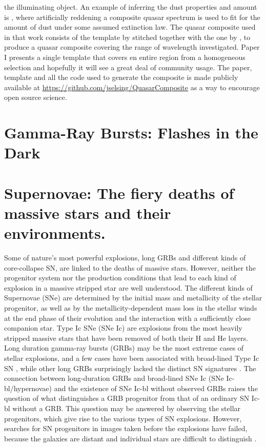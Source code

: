 the illuminating object. An example of inferring the dust properties and amount
is \citet{Krogager2015}, where artificially reddening a composite quasar
spectrum is used to fit for the amount of dust under some assumed extinction
law. The quasar composite used in that work consists of the template by
\citet{Vandenberk2001} stitched together with the one by \citet{Glikman2006}, to
produce a quasar composite covering the range of wavelength investigated. Paper
I presents a single template that covers en entire region from a homogeneous
selection and hopefully it will see a great deal of community usage. The paper,
template and all the code used to generate the composite is made publicly
available at \url{https://github.com/jselsing/QuasarComposite} as a way to
encourage open source science.

\section{Gamma-Ray Bursts: Flashes in the Dark}
\label{sec:intro:grb}


\section{Supernovae: The fiery deaths of massive stars and their environments.}
\label{sec:intro:sn}

Some of nature's most powerful explosions, long
  GRBs and different kinds of core-collapse SN, are linked to the
  deaths of massive stars. However, neither the progenitor system nor
  the production conditions that lead to each kind of explosion in a
  massive stripped star are well understood. The different kinds of
  Supernovae (SNe) are determined by the initial mass and metallicity
  of the stellar progenitor, as well as by the metallicity-dependent
  mass loss in the stellar winds at the end phase of their evolution
  and the interaction with a sufficiently close companion star. Type
  Ic SNe (SNe Ic) are explosions from the most heavily stripped
  massive stars that have been removed of both their H and He
  layers. Long duration gamma-ray bursts (GRBs) may be the most
  extreme cases of stellar explosions, and a few cases have been
  associated with broad-lined Type Ic SN \citep{Woosley2006}, while other long GRBs
  surprisingly lacked the distinct SN signatures \citep{Fynbo2006}. The connection
  between long-duration GRBs and broad-lined SNe Ic (SNe
  Ic-bl/hypernovae) and the existence of SNe Ic-bl without observed
  GRBs raises the question of what distinguishes a GRB progenitor from
  that of an ordinary SN Ic-bl without a GRB. This question may be
  answered by observing the stellar progenitors, which give rise to
  the various types of SN explosions. However, searches for SN
  progenitors in images taken before the explosions have failed,
  because the galaxies are distant and individual stars are difficult
  to distinguish \citep{Maund2005}.

